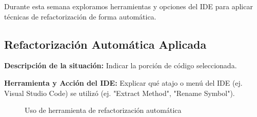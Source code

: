Durante esta semana exploramos herramientas y opciones del IDE para aplicar técnicas de refactorización de forma automática.

\subsection{Refactorización Automática Aplicada}
\textbf{Descripción de la situación:}
Indicar la porción de código seleccionada.

\textbf{Herramienta y Acción del IDE:}
Explicar qué atajo o menú del IDE (ej. Visual Studio Code) se utilizó (ej. "Extract Method", "Rename Symbol").

\begin{figure}[h]
    \centering
    \caption{Uso de herramienta de refactorización automática}
    \label{fig:semana5_ejemplo1}
\end{figure}
